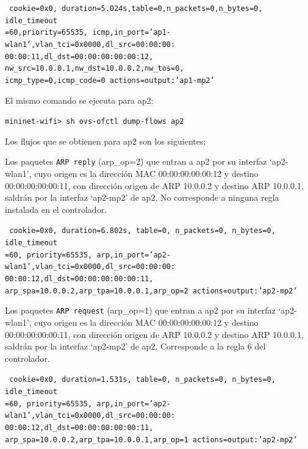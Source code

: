 \documentclass[a4paper,12pt,twoside,spanish]{book}
\begin{document}
\noindent\texttt{
	cookie=0x0, duration=5.024s,table=0,n\_packets=0,n\_bytes=0, idle\_timeout\\
	=60,priority=65535,
	icmp,in\_port='ap1-wlan1',vlan\_tci=0x0000,dl\_src=00:00:00:\\
	00:00:11,dl\_dst=00:00:00:00:00:12,
	nw\_src=10.0.0.1,nw\_dst=10.0.0.2,nw\_tos=0,\\
	icmp\_type=0,icmp\_code=0 actions=output:'ap1-mp2'
}

\hspace{1cm}

El mismo comando se ejecuta para ap2:\par 

\begin{center}
	\texttt{mininet-wifi> sh ovs-ofctl dump-flows ap2}
\end{center}

Los flujos que se obtienen para ap2 son los siguientes:\par

Los paquetes \texttt{ARP reply} (arp\_op=2) que entran a ap2 por su interfaz ‘ap2-wlan1’, cuyo origen es la dirección MAC 00:00:00:00:00:12 y destino 00:00:00:00:00:11, con dirección origen de ARP 10.0.0.2 y destino ARP 10.0.0.1, saldrán por la interfaz ‘ap2-mp2’ de ap2. No corresponde a ninguna regla instalada en el controlador.\par 

\noindent\texttt{
	cookie=0x0, duration=6.802s, table=0, n\_packets=0, n\_bytes=0, idle\_timeout\\
	=60, priority=65535,
	arp,in\_port='ap2-wlan1',vlan\_tci=0x0000,dl\_src=00:00:00:\\
	00:00:12,dl\_dst=00:00:00:00:00:11,
	arp\_spa=10.0.0.2,arp\_tpa=10.0.0.1,arp\_op=2 actions=output:'ap2-mp2'
}

Los paquetes \texttt{ARP request} (arp\_op=1) que entran a ap2 por su interfaz ‘ap2-wlan1’, cuyo origen es la dirección MAC 00:00:00:00:00:12 y destino 00:00:00:00:00:11, con dirección origen de ARP 10.0.0.2 y destino ARP 10.0.0.1, saldrán por la interfaz ‘ap2-mp2’ de ap2. Corresponde a la regla 6 del controlador.\par 

\noindent\texttt{
	cookie=0x0, duration=1.531s, table=0, n\_packets=0, n\_bytes=0, idle\_timeout\\
	=60, priority=65535,
	arp,in\_port='ap2-wlan1',vlan\_tci=0x0000,dl\_src=00:00:00:\\
	00:00:12,dl\_dst=00:00:00:00:00:11,
	arp\_spa=10.0.0.2,arp\_tpa=10.0.0.1,arp\_op=1 actions=output:'ap2-mp2'
}
\end{document}
